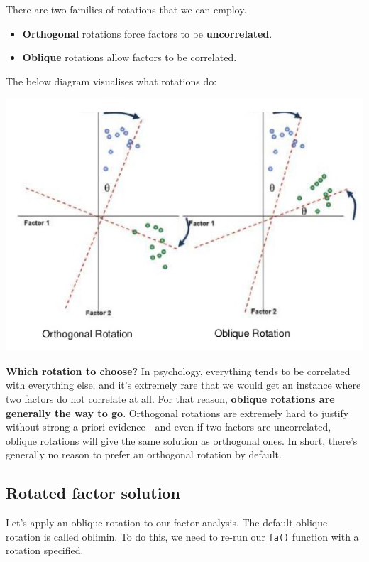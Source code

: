 \documentclass[
]{book}
\providecommand{\tightlist}{%
  \setlength{\itemsep}{0pt}\setlength{\parskip}{0pt}}
\begin{document}
There are two families of rotations that we can employ.

\begin{itemize}
\tightlist
\item
  \textbf{Orthogonal} rotations force factors to be \textbf{uncorrelated}.
\item
  \textbf{Oblique} rotations allow factors to be correlated.
\end{itemize}

The below diagram visualises what rotations do:

\includegraphics{img/rotations.png}

\textbf{Which rotation to choose?} In psychology, everything tends to be correlated with everything else, and it's extremely rare that we would get an instance where two factors do not correlate at all. For that reason, \textbf{oblique rotations are generally the way to go}. Orthogonal rotations are extremely hard to justify without strong a-priori evidence - and even if two factors are uncorrelated, oblique rotations will give the same solution as orthogonal ones. In short, there's generally no reason to prefer an orthogonal rotation by default.

\subsection{Rotated factor solution}\label{rotated-factor-solution}

Let's apply an oblique rotation to our factor analysis. The default oblique rotation is called oblimin. To do this, we need to re-run our \texttt{fa()} function with a rotation specified.
\end{document}
